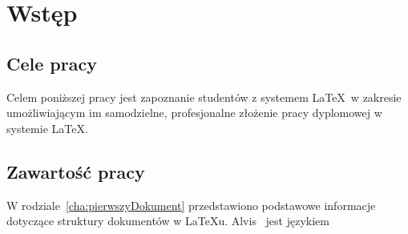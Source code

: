 \chapter{Wstęp}
\label{cha:wstep}


\section{Cele pracy}
\label{sec:celePracy}

Celem poniższej pracy jest zapoznanie studentów z systemem \LaTeX~w zakresie umożliwiającym im samodzielne, profesjonalne złożenie pracy dyplomowej w systemie \LaTeX.

\section{Zawartość pracy}
\label{sec:zawartoscPracy}

W rodziale~\ref{cha:pierwszyDokument} przedstawiono podstawowe informacje dotyczące struktury dokumentów w \LaTeX u. Alvis~\cite{Alvis2011} jest językiem 


















